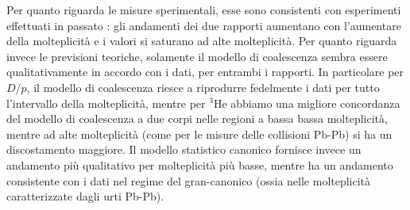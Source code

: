 Per quanto riguarda le misure sperimentali, esse sono consistenti con esperimenti effettuati in passato \cite{Adam_2016_a1, 2017_a2, Acharya_2018_a3}: gli andamenti dei due rapporti aumentano con l'aumentare della molteplicità e i valori si saturano ad alte molteplicità.
Per quanto riguarda invece le previsioni teoriche, solamente il modello di coalescenza sembra essere qualitativamente in accordo con i dati, per entrambi i rapporti.
In particolare per $D/p$, il modello di coalescenza riesce a riprodurre fedelmente i dati per tutto l'intervallo della molteplicità, mentre per $^3\text{He}$ abbiamo una migliore concordanza del modello di coalescenza a due corpi nelle regioni a bassa bassa molteplicità, mentre ad alte molteplicità (come per le misure delle collisioni Pb-Pb) si ha un discostamento maggiore.
Il modello statistico canonico fornisce invece un andamento più qualitativo per molteplicità più basse, mentre ha un andamento consistente con i dati nel regime del gran-canonico (ossia nelle molteplicità caratterizzate dagli urti Pb-Pb).